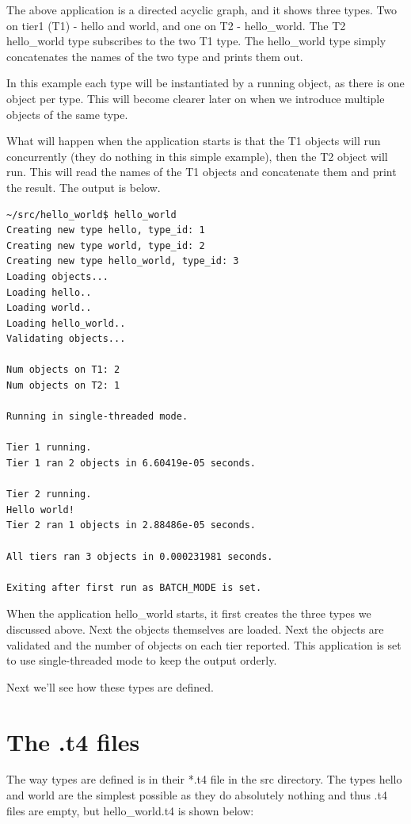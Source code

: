 \documentclass{report}
\begin{document}
The above application is a directed acyclic graph, and it shows three types. Two on tier1 (T1) - hello and world, and one on T2 - hello_world. The T2 hello_world type subscribes to the two T1 type. The hello_world type simply concatenates the names of the two type and prints them out.

In this example each type will be instantiated by a running object, as there is one object per type. This will become clearer later on when we introduce multiple objects of the same type.

What will happen when the application starts is that the T1 objects will run concurrently (they do nothing in this simple example), then the T2 object will run. This will read the names of the T1 objects and concatenate them and print the result. The output is below.

\begin{verbatim}
~/src/hello_world$ hello_world
Creating new type hello, type_id: 1
Creating new type world, type_id: 2
Creating new type hello_world, type_id: 3
Loading objects...
Loading hello..
Loading world..
Loading hello_world..
Validating objects...

Num objects on T1: 2
Num objects on T2: 1

Running in single-threaded mode.

Tier 1 running.
Tier 1 ran 2 objects in 6.60419e-05 seconds.

Tier 2 running.
Hello world!
Tier 2 ran 1 objects in 2.88486e-05 seconds.

All tiers ran 3 objects in 0.000231981 seconds.

Exiting after first run as BATCH_MODE is set.
\end{verbatim}

When the application hello_world starts, it first creates the three types we discussed above. Next the objects themselves are loaded. Next the objects are validated and the number of objects on each tier reported. This application is set to use single-threaded mode to keep the output orderly. 

Next we'll see how these types are defined.

\section{The .t4 files}

The way types are defined is in their *.t4 file in the src directory. The types hello and world are the simplest possible as they do absolutely nothing and thus .t4 files are empty, but hello_world.t4 is shown below:
\end{document}
